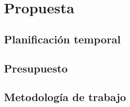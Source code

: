 \chapter{Propuesta}

\section{Planificación temporal}


\section{Presupuesto}



\section{Metodología de trabajo}







